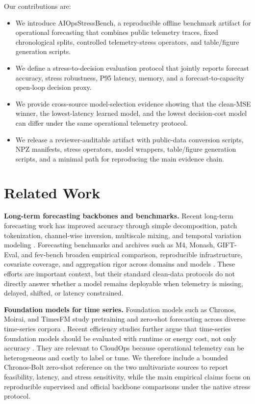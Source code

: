 \documentclass[conference]{IEEEtran}
\begin{document}
Our contributions are:
\begin{itemize}
    \item We introduce AIOpsStressBench, a reproducible offline benchmark artifact for operational forecasting that combines public telemetry traces, fixed chronological splits, controlled telemetry-stress operators, and table/figure generation scripts.
    \item We define a stress-to-decision evaluation protocol that jointly reports forecast accuracy, stress robustness, P95 latency, memory, and a forecast-to-capacity open-loop decision proxy.
    \item We provide cross-source model-selection evidence showing that the clean-MSE winner, the lowest-latency learned model, and the lowest decision-cost model can differ under the same operational telemetry protocol.
    \item We release a reviewer-auditable artifact with public-data conversion scripts, NPZ manifests, stress operators, model wrappers, table/figure generation scripts, and a minimal path for reproducing the main evidence chain.
\end{itemize}

\section{Related Work}

\noindent\textbf{Long-term forecasting backbones and benchmarks.}
Recent long-term forecasting work has improved accuracy through simple decomposition, patch tokenization, channel-wise inversion, multiscale mixing, and temporal variation modeling \cite{dlinear,patchtst,itransformer,timemixer,timesnet}. Forecasting benchmarks and archives such as M4, Monash, GIFT-Eval, and fev-bench broaden empirical comparison, reproducible infrastructure, covariate coverage, and aggregation rigor across domains and models \cite{m4,monash,gifteval,fevbench}. These efforts are important context, but their standard clean-data protocols do not directly answer whether a model remains deployable when telemetry is missing, delayed, shifted, or latency constrained.

\noindent\textbf{Foundation models for time series.}
Foundation models such as Chronos, Moirai, and TimesFM study pretraining and zero-shot forecasting across diverse time-series corpora \cite{chronos,moirai,timesfm}. Recent efficiency studies further argue that time-series foundation models should be evaluated with runtime or energy cost, not only accuracy \cite{fmenergy}. They are relevant to CloudOps because operational telemetry can be heterogeneous and costly to label or tune. We therefore include a bounded Chronos-Bolt zero-shot reference on the two multivariate sources to report feasibility, latency, and stress sensitivity, while the main empirical claims focus on reproducible supervised and official backbone comparisons under the native stress protocol.
\end{document}
